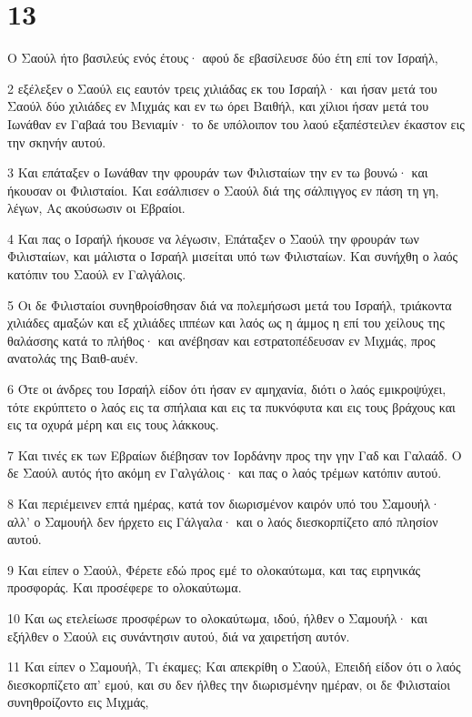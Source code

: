 \chapter{13}

\par Ο Σαούλ ήτο βασιλεύς ενός έτους· αφού δε εβασίλευσε δύο έτη επί τον Ισραήλ,
\par 2 εξέλεξεν ο Σαούλ εις εαυτόν τρεις χιλιάδας εκ του Ισραήλ· και ήσαν μετά του Σαούλ δύο χιλιάδες εν Μιχμάς και εν τω όρει Βαιθήλ, και χίλιοι ήσαν μετά του Ιωνάθαν εν Γαβαά του Βενιαμίν· το δε υπόλοιπον του λαού εξαπέστειλεν έκαστον εις την σκηνήν αυτού.
\par 3 Και επάταξεν ο Ιωνάθαν την φρουράν των Φιλισταίων την εν τω βουνώ· και ήκουσαν οι Φιλισταίοι. Και εσάλπισεν ο Σαούλ διά της σάλπιγγος εν πάση τη γη, λέγων, Ας ακούσωσιν οι Εβραίοι.
\par 4 Και πας ο Ισραήλ ήκουσε να λέγωσιν, Επάταξεν ο Σαούλ την φρουράν των Φιλισταίων, και μάλιστα ο Ισραήλ μισείται υπό των Φιλισταίων. Και συνήχθη ο λαός κατόπιν του Σαούλ εν Γαλγάλοις.
\par 5 Οι δε Φιλισταίοι συνηθροίσθησαν διά να πολεμήσωσι μετά του Ισραήλ, τριάκοντα χιλιάδες αμαξών και εξ χιλιάδες ιππέων και λαός ως η άμμος η επί του χείλους της θαλάσσης κατά το πλήθος· και ανέβησαν και εστρατοπέδευσαν εν Μιχμάς, προς ανατολάς της Βαιθ-αυέν.
\par 6 Ότε οι άνδρες του Ισραήλ είδον ότι ήσαν εν αμηχανία, διότι ο λαός εμικροψύχει, τότε εκρύπτετο ο λαός εις τα σπήλαια και εις τα πυκνόφυτα και εις τους βράχους και εις τα οχυρά μέρη και εις τους λάκκους.
\par 7 Και τινές εκ των Εβραίων διέβησαν τον Ιορδάνην προς την γην Γαδ και Γαλαάδ. Ο δε Σαούλ αυτός ήτο ακόμη εν Γαλγάλοις· και πας ο λαός τρέμων κατόπιν αυτού.
\par 8 Και περιέμεινεν επτά ημέρας, κατά τον διωρισμένον καιρόν υπό του Σαμουήλ· αλλ' ο Σαμουήλ δεν ήρχετο εις Γάλγαλα· και ο λαός διεσκορπίζετο από πλησίον αυτού.
\par 9 Και είπεν ο Σαούλ, Φέρετε εδώ προς εμέ το ολοκαύτωμα, και τας ειρηνικάς προσφοράς. Και προσέφερε το ολοκαύτωμα.
\par 10 Και ως ετελείωσε προσφέρων το ολοκαύτωμα, ιδού, ήλθεν ο Σαμουήλ· και εξήλθεν ο Σαούλ εις συνάντησιν αυτού, διά να χαιρετήση αυτόν.
\par 11 Και είπεν ο Σαμουήλ, Τι έκαμες; Και απεκρίθη ο Σαούλ, Επειδή είδον ότι ο λαός διεσκορπίζετο απ' εμού, και συ δεν ήλθες την διωρισμένην ημέραν, οι δε Φιλισταίοι συνηθροίζοντο εις Μιχμάς,
